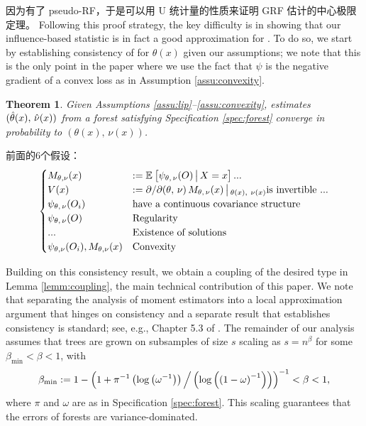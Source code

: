 \documentclass[aos]{imsart}
\theoremstyle{plain}
\newtheorem{theo}[prop]{Theorem}
\theoremstyle{definition}
\theoremstyle{remark}
\begin{document}
\begin{CJK}{UTF8}{gbsn}
因为有了 pseudo-RF，于是可以用 U 统计量的性质来证明 GRF 估计的中心极限定理。 Following this proof strategy, the key difficulty is in showing that our influence-based statistic
 is in fact a good approximation for .
To do so, we start by establishing consistency of  for $\theta(x)$ given
our assumptions; we note that this is the only point in the paper where we use the fact that
$\psi$ is the negative gradient of a convex loss as in Assumption \ref{assu:convexity}.

\begin{theo}
\label{theo:consistency}
Given Assumptions \ref{assu:lip}--\ref{assu:convexity},
estimates $(\hat{\theta}(x), \, \hat{\nu}(x))$ from a 
forest satisfying Specification \ref{spec:forest}
converge in probability to $(\theta(x), \, \nu(x))$.
\end{theo}

前面的6个假设：
\begin{equation*}
\begin{cases}
M_{\theta, \nu}(x) &:= \EE{\psi_{\theta, \, \nu}(O) \cond X = x} ... \\
V(x) &:= {\partial}/{\partial (\theta, \, \nu)} \, M_{\theta, \, \nu}(x) \cond_{\theta(x), \ \nu(x)} \text{is invertible ...} \\ 
\psi_{\theta, \, \nu}(O_i) &\text{have a continuous covariance structure} \\
\psi_{\theta, \, \nu}(O) &\text{Regularity} \\
... &\text{Existence of solutions} \\
\psi_{\theta, \nu}(O_i), M_{\theta, \nu}(x) &\text{Convexity}
\end{cases}
\end{equation*}

Building on this consistency result, we obtain a coupling of the desired type in Lemma \ref{lemm:coupling},
the main technical contribution of this paper.
We note that separating the analysis of moment estimators
into a local approximation argument that hinges on consistency and a separate result that establishes
consistency is standard; see, e.g., Chapter 5.3 of \citet{van2000asymptotic}.
The remainder of our analysis assumes that trees are grown on subsamples of size $s$
scaling as $s = n^\beta$ for some $\beta_{\min} < \beta < 1$, with
\begin{equation}
\label{eq:scaling}
\beta_{\min} := 1 - \p{1 + \pi^{-1} \p{\log\p{\omega^{-1}}} \Big/\p{\log\p{\p{1 - \omega}^{-1}}}}^{-1} < \beta < 1,
\end{equation}
where $\pi$ and $\omega$ are as in Specification \ref{spec:forest}.
This scaling guarantees that the errors of forests are variance-dominated.


\end{CJK}
\end{document}
